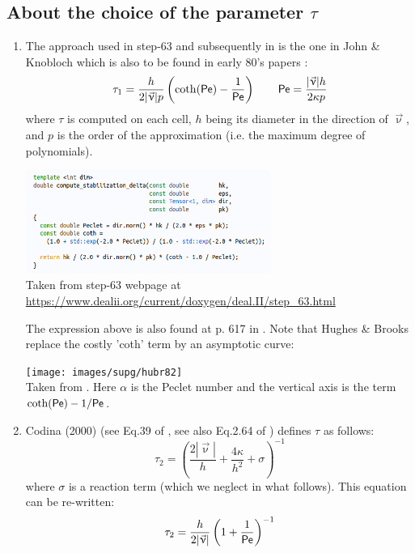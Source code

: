\subsection{About the choice of the parameter $\tau$}\label{ss:tausupg}

\begin{enumerate}
\item The approach used in step-63 and subsequently in \aspect{} is the 
one in John \& Knobloch \cite{jokn06,knob08} which is also to be found in early 
80's papers \cite{brhu82,hubr82}:
\[
\tau_1 = \frac{h}{2 |\vec\upnu| p} \left( \coth ({\mathsf{Pe}}) - \frac{1}{{\mathsf{Pe}}} \right)
\qquad
{\mathsf{Pe}} = \frac{|\vec\upnu| h}{2 \kappa p}
\]
where $\tau$ is computed on each cell, $h$ being its diameter in the direction of $\vec\upnu$, 
and $p$ is the order of the approximation (i.e. the maximum degree of polynomials).

\begin{center}
\includegraphics[width=8cm]{images/supg/step63}\\
{\captionfont Taken from step-63 webpage 
at \url{https://www.dealii.org/current/doxygen/deal.II/step_63.html}}
\end{center}

The expression above is also found at p. 617 in \textcite{lomw12}.
Note that Hughes \& Brooks \cite{hubr82} replace the costly 'coth' term by an asymptotic curve:

\begin{center}
\texttt{[image: images/supg/hubr82]}\\
{\captionfont Taken from \cite{hubr82}. Here $\alpha$ is the Peclet number and the vertical axis
is the term $ \coth ({\mathsf{Pe}}) -1/{\mathsf{Pe}}$.}
\end{center}


\item
Codina (2000) (see Eq.39 of \cite{codi00}, see also Eq.2.64 of \textcite{dohu03}) defines $\tau$ as follows:
\[
\tau_2= \left( \frac{2 |\vec\upnu|}{h} + \frac{4 \kappa}{h^2} + \sigma   \right)^{-1}
\]
where $\sigma$ is a reaction term (which we neglect in what follows). This equation 
can be re-written:
\[
\tau_2= \frac{h}{2 |\vec\upnu|} \left( 1 + \frac{1}{{\mathsf{Pe}}} \right)^{-1}
\]




\end{enumerate}
